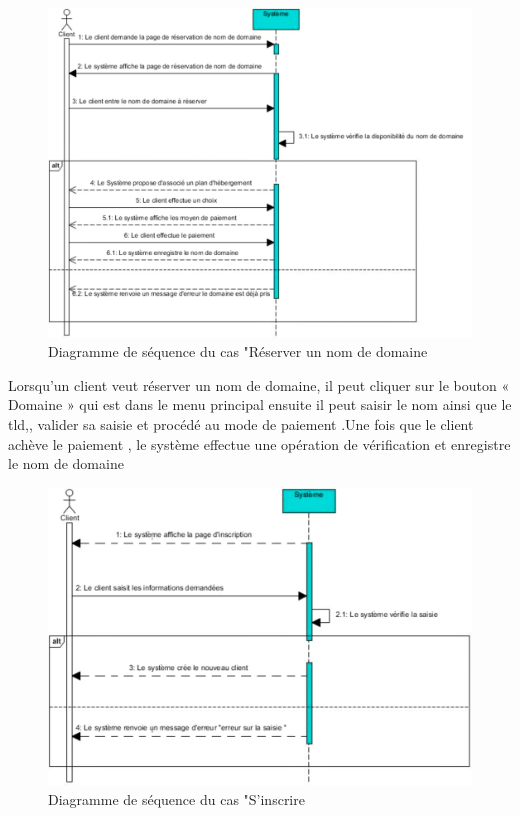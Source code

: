 \documentclass[a4paper, 12pt]{report}
\begin{document}
\begin{figure}[H]
	\centering
	\includegraphics{img/sequence/2}
	\caption{Diagramme de séquence du cas "Réserver un nom de domaine}
	\label{Tux}
\end{figure}
\noindent Lorsqu’un client veut réserver un nom de domaine, il peut cliquer sur le bouton « Domaine » qui est dans le menu principal ensuite il peut saisir le nom ainsi que le tld,, valider sa saisie et procédé au mode de paiement .Une fois que le client achève le paiement , le système effectue une opération de vérification et enregistre le nom de domaine
\begin{figure}[H]
	\centering
	\includegraphics{img/sequence/3}
	\caption{Diagramme de séquence du cas "S’inscrire}
	\label{Tux}
\end{figure}
\end{document}
